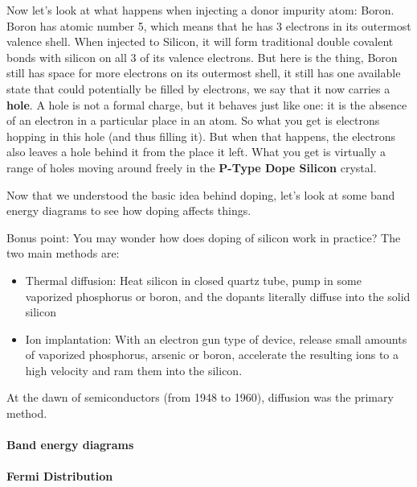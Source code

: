 Now let's look at what happens when injecting a donor impurity atom: Boron. Boron has atomic number 5, which means that he has 3 electrons in its outermost valence shell. When injected to Silicon, it will form traditional double covalent bonds with silicon on all 3 of its valence electrons. But here is the thing, Boron still has space for more electrons on its outermost shell, it still has one available state that could potentially be filled by electrons, we say that it now carries a \textbf{hole}. A hole is not a formal charge, but it behaves just like one: it is the absence of an electron in a particular place in an atom.  So what you get is electrons hopping in this hole (and thus filling it). But when that happens, the electrons also leaves a hole behind it from the place it left. What you get is virtually a range of holes moving around freely in the \textbf{P-Type Dope Silicon} crystal.  

Now that we understood the basic idea behind doping, let's look at some band energy diagrams to see how doping affects things. 



Bonus point: You may wonder how does doping of silicon work in practice? The two main methods are:
\begin{itemize}
    \item Thermal diffusion: Heat silicon in closed quartz tube, pump in some vaporized phosphorus or boron, and the dopants literally diffuse into the solid silicon
    \item Ion implantation: With an electron gun type of device, release small amounts of vaporized phosphorus, arsenic or boron, accelerate the resulting ions to a high velocity and ram them into the silicon.  
\end{itemize}
At the dawn of semiconductors (from 1948 to 1960), diffusion was the primary method.

\paragraph{Band energy diagrams}

\paragraph{Fermi Distribution}






